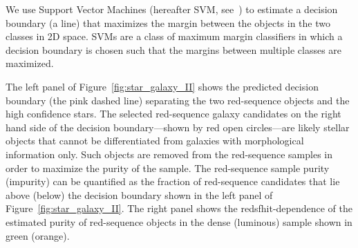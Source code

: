 \documentclass{aa}
\numberwithin{equation}{section}
\begin{document}
We use Support Vector Machines (hereafter SVM, see~\citealt{cortes1995, cristianini2000, scholkopf2000}) to estimate a decision boundary (a line) that maximizes the margin between the objects in the two classes in 2D space. SVMs are a class of maximum margin classifiers in which a decision boundary is chosen such that the margins between multiple classes are maximized.

The left panel of Figure~\ref{fig:star_galaxy_II} shows the predicted decision boundary (the pink dashed line) separating the two red-sequence objects and the high confidence stars. The selected red-sequence galaxy candidates on the right hand side of the decision boundary---shown by red open circles---are likely stellar objects that cannot be differentiated from galaxies with morphological information only. Such objects are removed from the red-sequence samples in order to maximize the purity of the sample. The red-sequence sample purity (impurity) can be quantified as the fraction of red-sequence candidates that lie above (below) the decision boundary shown in the left panel of Figure~\ref{fig:star_galaxy_II}. The right panel shows the redsfhit-dependence of the estimated purity of red-sequence objects in the dense (luminous) sample shown in green (orange).
\end{document}
